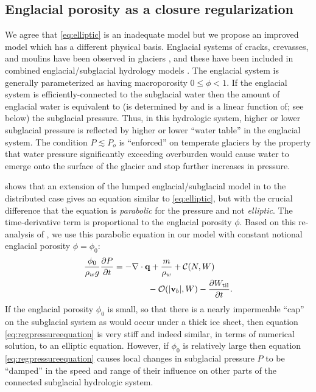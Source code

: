 \documentclass[gmd]{copernicus}   %
\newcommand{\text}{\textrm}
\newcommand\bv{\mathbf{v}}
\newcommand\bq{\mathbf{q}}
\newcommand{\ddt}[1]{\ensuremath{\frac{\partial #1}{\partial t}}}
\newcommand{\Div}{\nabla\cdot}
\newcommand{\Wtil}{W_{\text{til}}}
\begin{document}
\subsection{Englacial porosity as a closure regularization}  We agree that \eqref{eq:elliptic} is an inadequate model but we propose an improved model which has a different physical basis.  Englacial systems of cracks, crevasses, and moulins have been observed in glaciers \citep[for example]{Bartholomausetal2008,Harperetal2010}, and these have been included in combined englacial/subglacial hydrology models \citep[among others]{FlowersClarke2002_theory,Bartholomausetal2011,Hewitt2013}.  The englacial system is generally parameterized as having macroporosity $0\le \phi < 1$.  If the englacial system is efficiently-connected to the subglacial water then the amount of englacial water is equivalent to (is determined by and is a linear function of; see below) the subglacial pressure.  Thus, in this hydrologic system, higher or lower subglacial pressure is reflected by higher or lower ``water table'' in the englacial system.  The condition $P\lesssim P_o$ is ``enforced'' on temperate glaciers by the property that water pressure significantly exceeding overburden would cause water to emerge onto the surface of the glacier and stop further increases in pressure.

\cite{Bueler2014correspondence} shows that an extension of the lumped englacial/subglacial model in \cite{Bartholomausetal2011} to the distributed case gives an equation similar to \eqref{eq:elliptic}, but with the crucial difference that the equation is \emph{parabolic} for the pressure and not \emph{elliptic}.  The time-derivative term is proportional to the englacial porosity $\phi$.  Based on this re-analysis of \cite{Bartholomausetal2011}, we use this parabolic equation in our model with constant notional englacial porosity $\phi=\phi_0$:
\begin{align}
\frac{\phi_0}{\rho_w g} \ddt{P} &= - \Div \bq + \frac{m}{\rho_w} + \mathcal{C}(N,W)  \label{eq:regpressureequation} \\
  &\qquad\qquad - \mathcal{O}(|\bv_b|,W) - \ddt{\Wtil}. \notag
\end{align}
If the englacial porosity $\phi_0$ is small, so that there is a nearly impermeable ``cap'' on the subglacial system as would occur under a thick ice sheet, then equation \eqref{eq:regpressureequation} is very stiff and indeed similar, in terms of numerical solution, to an elliptic equation.  However, if $\phi_0$ is relatively large then equation \eqref{eq:regpressureequation} causes local changes in subglacial pressure $P$ to be ``damped'' in the speed and range of their influence on other parts of the connected subglacial hydrologic system.
\end{document}
